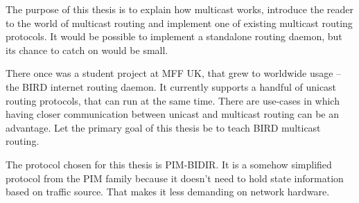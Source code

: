 The purpose of this thesis is to explain how multicast works, introduce the
reader to the world of multicast routing and implement one of existing
multicast routing protocols. It would be possible to implement a standalone
routing daemon, but its chance to catch on would be small.

There once was a student project at MFF UK, that grew to worldwide usage -- the BIRD
internet routing daemon. It currently supports a handful of unicast routing
protocols, that can run at the same time. There are use-cases in which having closer communication
between unicast and multicast routing can be an advantage. Let the primary goal of
this thesis be to teach BIRD multicast routing.%

The protocol chosen for this thesis is PIM-BIDIR. It is a somehow simplified
protocol from the PIM family because it doesn't need to hold state information
based on traffic source. That makes it less demanding on network hardware.
